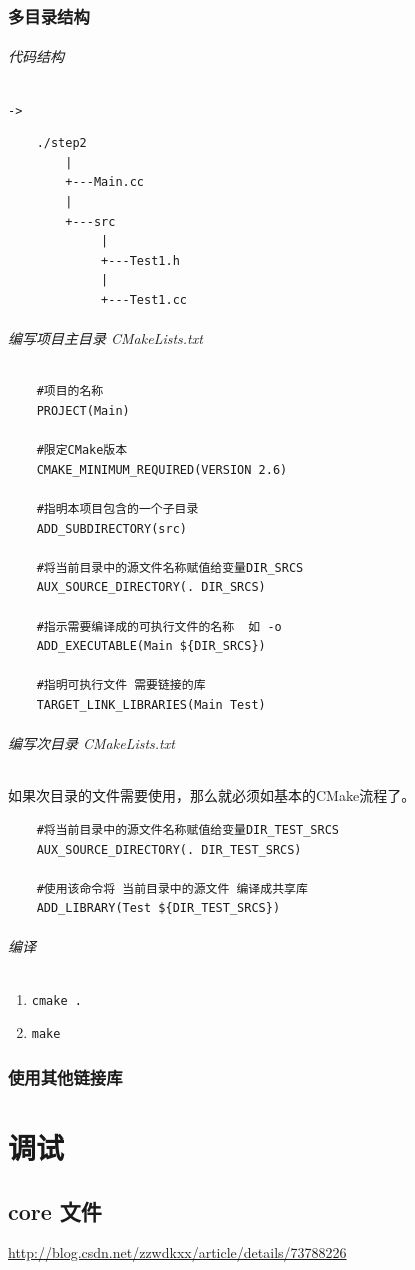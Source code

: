 \documentclass[UTF8,a4paper,12pt]{ctexbook}
\begin{document}
		\subsection{多目录结构}
			\subparagraph{代码结构}\verb|-> |
				\begin{lstlisting}
	./step2
		|
		+---Main.cc
		|
		+---src
			 |
			 +---Test1.h
			 |
			 +---Test1.cc
				\end{lstlisting}
				
			\subparagraph{编写项目主目录 CMakeLists.txt}
				\begin{lstlisting}
	#项目的名称
	PROJECT(Main)
	
	#限定CMake版本
	CMAKE_MINIMUM_REQUIRED(VERSION 2.6)
	
	#指明本项目包含的一个子目录
	ADD_SUBDIRECTORY(src)
	
	#将当前目录中的源文件名称赋值给变量DIR_SRCS
	AUX_SOURCE_DIRECTORY(. DIR_SRCS)
	
	#指示需要编译成的可执行文件的名称  如 -o
	ADD_EXECUTABLE(Main ${DIR_SRCS})
	
	#指明可执行文件 需要链接的库
	TARGET_LINK_LIBRARIES(Main Test)
				\end{lstlisting}
			
			\subparagraph{编写次目录 CMakeLists.txt}如果次目录的文件需要使用，那么就必须如基本的CMake流程了。
			
				\begin{lstlisting}
	#将当前目录中的源文件名称赋值给变量DIR_TEST_SRCS
	AUX_SOURCE_DIRECTORY(. DIR_TEST_SRCS)
	
	#使用该命令将 当前目录中的源文件 编译成共享库
	ADD_LIBRARY(Test ${DIR_TEST_SRCS})
				\end{lstlisting}
			
			\subparagraph{编译}
				\begin{enumerate}[itemindent = 2em]
					\item \verb|cmake .|
					\item \verb|make|
				\end{enumerate}
			
		\subsection{使用其他链接库}
			
		
\chapter{调试}
	\section{core 文件}
		\url{http://blog.csdn.net/zzwdkxx/article/details/73788226}
\end{document}
